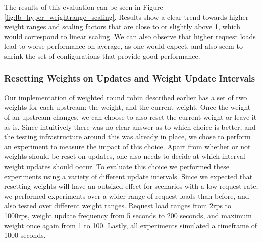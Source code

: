 The results of this evaluation can be seen in Figure \ref{fig:lb_hyper_weightrange_scaling}.
Results show a clear trend towards higher weight ranges and scaling factors that are close to or slightly above 1, which would correspond to linear scaling.
We can also observe that higher request loads lead to worse performance on average, as one would expect, and also seem to shrink the set of configurations that provide good performance.

\subsubsection{Resetting Weights on Updates and Weight Update Intervals}
Our implementation of weighted round robin described earlier has a set of two weights for each upstream: the weight, and the current weight.
Once the weight of an upstream changes, we can choose to also reset the current weight or leave it as is.
Since intuitively there was no clear answer as to which choice is better, and the testing infrastructure around this was already in place, we chose to perform an experiment to measure the impact of this choice.
Apart from whether or not weights should be reset on updates, one also needs to decide at which interval weight updates should occur.
To evaluate this choice we performed these experiments using a variety of different update intervals.
Since we expected that resetting weights will have an outsized effect for scenarios with a low request rate, we performed experiments over a wider range of request loads than before, and also tested over different weight ranges.
Request load ranges from 2\gls{rps} to 1000\gls{rps}, weight update frequency from 5 seconds to 200 seconds, and maximum weight once again from 1 to 100.
Lastly, all experiments simulated a timeframe of 1000 seconds.

